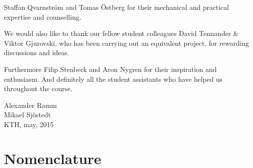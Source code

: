 \documentclass[a4paper,11pt]{kth-mag}
\begin{document}
Staffan Qvarnström and Tomas Östberg for their mechanical and practical expertise and counselling.

We would also like to thank our fellow student colleagues David Tennander \& Viktor Gjurovski, who has been carrying out an equivalent project, for rewarding discussions and ideas.

Furthermore Filip Stenbeck and Aron Nygren for their inspiration and enthusiasm. And definitely all the student assistants who have helped us throughout the course.


\begin{flushright}Alexander Ramm \\Mikael Sjöstedt \\ KTH, may, 2015 \end{flushright}
 



\cleardoublepage
{}
\printindex
\tableofcontents*

\cleardoublepage
\chapter*{Nomenclature}
\end{document}

